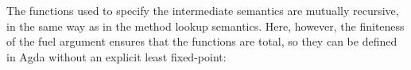 \begin{AgdaAlign}
The functions used to specify the intermediate semantics are mutually recursive,
in the same way as in the method lookup semantics.
Here, however, the finiteness of the fuel argument ensures that the functions are total,
so they can be defined in Agda without an explicit least fixed-point:
%
\begin{code}%
%
\>[2]%
\>[11]\AgdaSymbol{:}\AgdaSpace{}%
\AgdaSpace{}%
\AgdaSpace{}%
\AgdaSpace{}%
\AgdaSpace{}%
\AgdaSpace{}%
\AgdaSpace{}%
\<%
\\
%
\>[2]%
\>[11]\AgdaSymbol{:}\AgdaSpace{}%
\AgdaSpace{}%
\AgdaSpace{}%
\AgdaSpace{}%
\AgdaSpace{}%
\AgdaSpace{}%
\AgdaSpace{}%
\AgdaSpace{}%
\AgdaSpace{}%
\<%
\\
%
\>[2]%
\>[11]\AgdaSymbol{:}\AgdaSpace{}%
\AgdaSpace{}%
\AgdaSpace{}%
\AgdaSpace{}%
\AgdaSpace{}%
\AgdaSpace{}%
\AgdaSpace{}%
\AgdaSpace{}%
\AgdaSpace{}%
\AgdaSpace{}%
\AgdaSpace{}%
\<%
\\
%
\\[\AgdaEmptyExtraSkip]%
%
\>[2]\AgdaSpace{}%
\AgdaSpace{}%
\AgdaSpace{}%
\AgdaSymbol{=}\AgdaSpace{}%
\AgdaSpace{}%
\AgdaSpace{}%
\AgdaSymbol{(}\AgdaSpace{}%
\AgdaSymbol{)}\AgdaSpace{}%
\<%
\\
%
\\[\AgdaEmptyExtraSkip]%
%
\>[2]\AgdaSpace{}%
\AgdaSpace{}%
\AgdaSpace{}%
\AgdaSpace{}%
\AgdaSymbol{=}\AgdaSpace{}%
\<%
\\
%
\>[2]\AgdaSpace{}%
\AgdaSpace{}%
\AgdaCatchallClause{\AgdaSymbol{(}}\AgdaSpace{}%
\AgdaSpace{}%
\AgdaCatchallClause{\AgdaSymbol{)}}\AgdaSpace{}%

\end{code}
\end{AgdaAlign}
